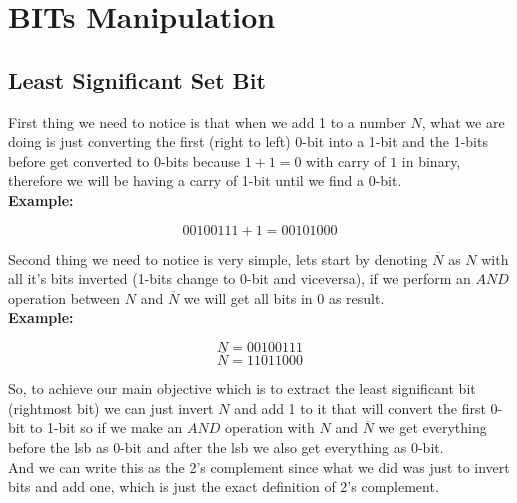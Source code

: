 \documentclass[twoside]{article}
\begin{document}

\null
\thispagestyle{empty}
\newpage
{}
\selectfont
\begin{multicols*}{2}
	\tableofcontents
	\newpage
	\cleardoublepage
	\end{multicols*}
\sectionfont{\bfseries\sffamily\centering\Huge}
\vspace{1em}
\section*{BITs Manipulation}
\vspace{3em}
\subsectionfont{\large\bfseries\sffamily\underline}
\subsection*{Least Significant Set Bit}
First thing we need to notice is that when we add 1 to a number $N$, what we are doing is just converting the first (right to left) 0-bit into a 1-bit and the 1-bits before get converted to 0-bits because $1 + 1 = 0$ with carry of $1$ in binary, therefore we will be having a carry of 1-bit until we find a 0-bit.\\

\textbf{Example:}

$$00100111 + 1 = 00101000$$

Second thing we need to notice is very simple, lets start by denoting $\overline{N}$ as $N$ with all it's bits inverted (1-bits change to 0-bit and viceversa), if we perform an $AND$ operation between $N$ and $\overline{N}$ we will get all bits in $0$ as result.\\

\textbf{Example:}

$$N = 00100111$$
$$\overline{N} = 11011000$$

So, to achieve our main objective which is to extract the least significant bit (rightmost bit) we can just invert $N$ and add 1 to it that will convert the first 0-bit to 1-bit so if we make an $AND$ operation with $N$ and $\overline{N}$ we get everything before the lsb as 0-bit and after the lsb we also get everything as 0-bit.\\

And we can write this as the 2's complement since what we did was just to invert bits and add one, which is just the exact definition of 2's complement.\\
\end{document}
